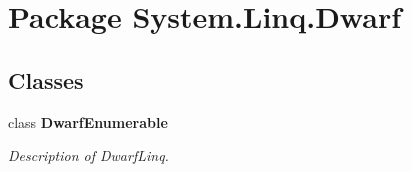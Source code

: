 \hypertarget{namespace_system_1_1_linq_1_1_dwarf}{\section{Package System.\+Linq.\+Dwarf}
\label{namespace_system_1_1_linq_1_1_dwarf}
}
\subsection*{Classes}
\begin{DoxyCompactItemize}
\item 
class {\bfseries Dwarf\+Enumerable}
\begin{DoxyCompactList}\small\item\em Description of Dwarf\+Linq. \end{DoxyCompactList}\end{DoxyCompactItemize}
